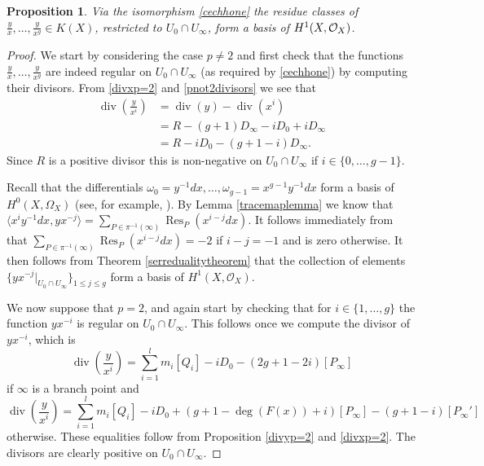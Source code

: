 \documentclass[draft, 11pt]{article} %
\theoremstyle{plain}
\newtheorem{prop}[defn]{Proposition}
\theoremstyle{remark}
\newcommand{\cO}{{\cal O}}
\newcommand{\hzero}{{H^0(X,\Omega_X)}}
\newcommand{\hone}{H^1(X,\mathcal{O}_X)}
\DeclareMathOperator{\res}{Res}
\DeclareMathOperator{\di}{div}
\begin{document}
\begin{prop}\label{basish1}
 Via the isomorphism \eqref{cechhone} the residue classes of $\frac{y}{x}, \ldots , \frac{y}{x^g} \in K(X)$, restricted to $U_0 \cap U_\infty$, form a basis of $H^1(X,\cO_X)$.
\end{prop}
\begin{proof}
We start by considering the case $p \neq 2$ and first check that the functions $\frac{y}{x}, \ldots, \frac{y}{x^g}$ are indeed regular on $U_0 \cap U_\infty$ (as required by \eqref{cechhone}) by computing their divisors.
From \eqref{divxp=2} and \eqref{pnot2divisors} we see that
\begin{align}\label{divisorofyoverx}
\di \left( \frac{y}{x^i} \right) & = \di (y) - \di ( x^i) \nonumber \\
& = R - (g+1)D_\infty - iD_0 + iD_\infty \nonumber \\
& = R - iD_0 - (g+1 - i)D_\infty.
\end{align}
Since $R$ is a positive divisor this is non-negative on $U_0 \cap U_\infty$ if $i\in \{0, \ldots, g-1\}$.


Recall that the differentials $\omega_0 = y^{-1}dx, \ldots, \omega_{g-1} = x^{g-1}y^{-1}dx$ form a basis of $\hzero$ (see, for example, \cite[Chap 7, Prop. 4.26]{liu}).
By Lemma \ref{tracemaplemma} we know that $\langle x^iy^{-1}dx, yx^{-j} \rangle = \sum_{P \in \pi^{-1}(\infty)}\res_P(x^{i-j}dx)$.
It follows immediately from \cite[Chap. III, Thm. 7.14.1(b)]{hart} that $\sum_{P \in \pi^{-1}(\infty)}\res_P(x^{i-j}dx) = -2$ if $i-j=-1$ and is zero otherwise.
It then follows from Theorem \ref{serredualitytheorem} that the collection of elements $\{ yx^{-j}|_{U_0\cap U_\infty}\}_{ 1 \leq j \leq g}$ form a basis of $\hone$.



We now suppose that $p=2$, and again start by checking that for $i \in \{1, \ldots , g\}$ the function $yx^{-i}$ is regular on $U_0 \cap U_\infty$.
This follows once we compute the divisor of $yx^{-i}$, which is
\begin{equation*}
\di \left( \frac{y}{x^i} \right)  =  
{\displaystyle \sum_{i=1}^l} m_i[Q_i] -iD_0 -(2g+1 - 2i)[P_\infty]
\end{equation*}
if $\infty$ is a branch point and
\begin{equation*}
\di \left( \frac{y}{x^i} \right)  =  
{\displaystyle \sum_{i=1}^l} m_i[Q_i] - iD_0 +(g+1-\deg(F(x)) + i)[P_\infty] - (g+1-i)[P_\infty']
\end{equation*}
otherwise.
These equalities follow from Proposition \ref{divyp=2} and \eqref{divxp=2}.
The divisors are clearly positive on $U_0 \cap U_\infty$.


\end{proof}
\end{document}
